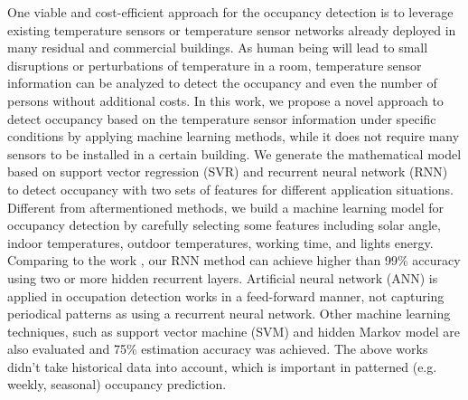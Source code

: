 One viable and cost-efficient approach for the occupancy detection is
to leverage existing temperature sensors or temperature sensor
networks already deployed in many residual and commercial
buildings. As human being will lead to small disruptions or
perturbations of temperature in a room, temperature sensor information
can be analyzed to detect the occupancy and even the number of persons
without additional costs.  
In this work, we propose a novel approach to detect occupancy based on
the temperature sensor information under specific conditions by
applying machine learning methods, while it does not require many
sensors to be installed in a certain building.  We generate the
mathematical model based on support vector regression (SVR) and
recurrent neural network (RNN) to detect occupancy with two sets of
features for different application situations.
\textcolor{feb18rev}{ Different from
  aftermentioned methods, we build a machine learning model for
  occupancy detection by carefully selecting some features including
  solar angle, indoor temperatures, outdoor temperatures, working
  time, and lights energy. Comparing to the work \cite{dong2014real},
  our RNN method can achieve higher than 99\% accuracy using two or
  more hidden recurrent layers. Artificial neural network (ANN) is
  applied in occupation detection works \cite{lam2009occupancy} in a
  feed-forward manner, not capturing periodical patterns as using a
  recurrent neural network. Other machine learning techniques, such as
  support vector machine (SVM) and hidden Markov model are also
  evaluated and 75\% estimation accuracy was achieved. The above works
  didn't take historical data into account, which is important in
  patterned (e.g.  weekly, seasonal) occupancy prediction.}
